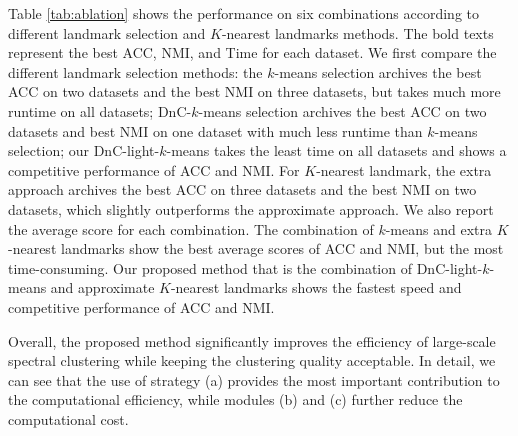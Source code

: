 Table \ref{tab:ablation} shows the performance on six combinations according to different landmark selection and $K$-nearest landmarks methods.
The bold texts represent the best ACC, NMI, and Time for each dataset.
We first compare the different landmark selection methods:
the $k$-means selection archives the best ACC on two datasets and the best NMI on three datasets, but takes much more runtime on all datasets;
DnC-$k$-means selection archives the best ACC on two datasets and best NMI on one dataset with much less runtime than $k$-means selection;
our DnC-light-$k$-means takes the least time on all datasets and shows a competitive performance of ACC and NMI.
For $K$-nearest landmark, the extra approach archives the best ACC on three datasets and the best NMI on two datasets, which slightly outperforms the approximate approach.
We also report the average score for each combination.
The combination of $k$-means and extra $K$-nearest landmarks show the best average scores of ACC and NMI, but the most time-consuming.
Our proposed method that is the combination of DnC-light-$k$-means and approximate $K$-nearest landmarks shows the fastest speed and competitive performance of ACC and NMI.

Overall, the proposed method significantly improves the efficiency of large-scale spectral clustering while keeping the clustering quality acceptable.
In detail, we can see that the use of strategy (a) provides the most important contribution to the computational efficiency, while modules (b) and (c) further reduce the computational cost.